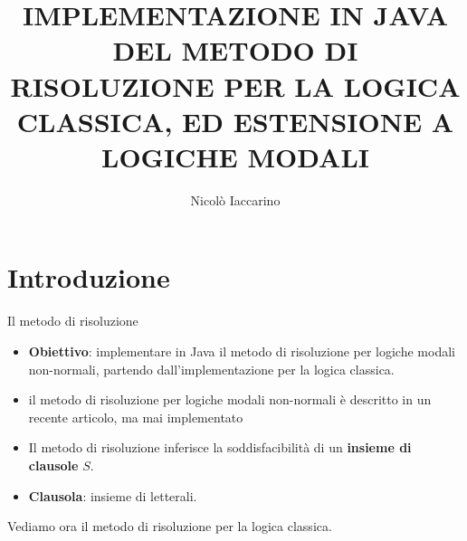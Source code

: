 \documentclass{beamer}
\title{IMPLEMENTAZIONE IN JAVA DEL METODO DI RISOLUZIONE PER LA LOGICA CLASSICA, ED ESTENSIONE A LOGICHE MODALI}
\author{Nicolò Iaccarino}
\begin{document}
\maketitle



\section{Introduzione}

\begin{frame}{Il metodo di risoluzione}
    \begin{itemize}
        \item \textbf{Obiettivo}: implementare in Java il metodo di risoluzione per logiche modali non-normali, partendo dall'implementazione per la logica classica.
        \vspace{10px}
        \item il metodo di risoluzione per logiche modali non-normali è descritto in un recente articolo, ma mai implementato
        \vspace{10px}
        \item Il metodo di risoluzione inferisce la soddisfacibilità di un \textbf{insieme di clausole} $S$.
        \vspace{10px}
        \item \textbf{Clausola}: insieme di letterali.
    \end{itemize}
    
    \vspace{10px}

    Vediamo ora il metodo di risoluzione per la logica classica.
\end{frame}
\end{document}
